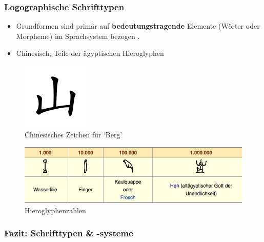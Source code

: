 \begin{frame}
\frametitle{Logographische Schrifttypen}

\begin{itemize}
	\item Grundformen sind primär auf \textbf{bedeutungstragende} Elemente (\zB Wörter oder Morpheme) im Sprachsystem bezogen \citep[vgl.][76--77]{Duerscheid04a}. 
	
	\item Chinesisch, Teile der ägyptischen Hieroglyphen
\end{itemize}
		
\begin{minipage}{.28\textwidth}
	\begin{figure}
	\centering
	\includegraphics[scale=.45]{material/Chinesemountain-Lee-Sau-Dan}
	\caption[chinese]{Chinesisches Zeichen für `Berg'}
	\end{figure}
\end{minipage}\hfill%
\begin{minipage}{.68\textwidth}
	\begin{figure}
	\centering
	\includegraphics[scale=.37]{material/04Hieroglyphenzahlen}
	\caption[Hiero]{Hieroglyphenzahlen}
	\end{figure}
\end{minipage}
		
\end{frame}


\subsubsection{Fazit: Schrifttypen \& -systeme}


